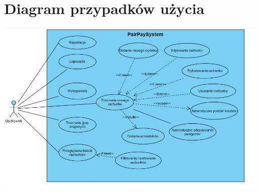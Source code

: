 \documentclass[12pt,titlepage]{article}
\begin{document}
\newpage

\section{Diagram przypadków użycia}
\includegraphics[width=1\textwidth]{UserDiagram.png}

    
\end{document}
